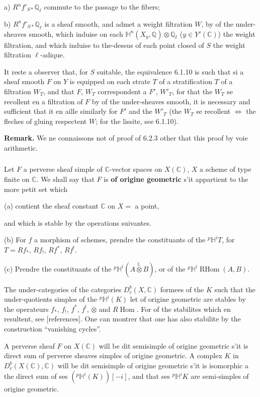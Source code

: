 \documentclass[12pt,a4paper]{article}
\theoremstyle{plain}
\theoremstyle{definition}
\theoremstyle{remark}
\DeclareMathOperator{\Hom}{Hom}
\DeclareMathOperator{\RHom}{RHom}
\newcommand{\CC}{\mathbb{C}}
\newcommand{\HH}{\mathbb{H}}
\newcommand{\QQ}{\mathbb{Q}}
\newcommand{\LL}{\mathbb{L}}
\begin{document}
a) $R^nf'_{S*}\QQ_{\ell}$ commute to the passage to the fibers;

b) $R^nf'_{S*}\QQ_{\ell}$ is a sheaf smooth, and admet a weight filtration $W$, by of the under-sheaves smooth, which induise on each $\HH^n(X_y, \QQ) \otimes \QQ_{\ell}$ ($y \in Y'(\CC)$) the weight filtration, and which induise to the-dessus of each point closed of $S$ the weight filtration $\ell$-adique.

It reste a observer that, for $S$ suitable, the equivalence 6.1.10 is such that si a sheaf smooth $F$ on $Y$ is equipped on each strate $T$ of a stratification $T$ of a filtration $W_T$, and that $F$, $W_T$ correspondent a $F'$, $W'_T$, for that the $W_T$ se recollent en a filtration of $F$ by of the under-sheaves smooth, it is necessary and sufficient that it en aille similarly for $F'$ and the $W'_T$ (the $W_T$ se recollent $\Leftrightarrow$ the fleches of gluing respectent $W$; for the lissite, see 6.1.10).

\medskip
\noindent\textbf{Remark.} We ne connaissons not of proof of 6.2.3 other that this proof by voie arithmetic.

\subsubsection{}
Let $F$ a perverse sheaf simple of $\CC$-vector spaces on $X(\CC)$, $X$ a scheme of type finite on $\CC$. We shall say that $F$ is \textbf{of origine geometric} s'it appartient to the more petit set which

(a) contient the sheaf constant $\CC$ on $X =$ a point,

and which is stable by the operations suivantes.

(b) For $f$ a morphism of schemes, prendre the constituants of the ${}^{p}\HH^iT$, for $T = Rf_*$, $Rf_!$, $Rf^*$, $Rf^!$.

(c) Prendre the constituants of the ${}^{p}\HH^i(A \overset{\LL}{\otimes} B)$, or of the ${}^{p}\HH^i\RHom(A, B)$.

The under-categories of the categories $D^b_c(X, \CC)$ formees of the $K$ such that the under-quotients simples of the ${}^{p}\HH^i(K)$ let of origine geometric are stables by the operateurs $f_*$, $f_!$, $f^*$, $f^!$, $\otimes$ and $R\Hom$. For of the stabilites which en resultent, see [references]. One can montrer that one has also stabilite by the construction ``vanishing cycles''.

A perverse sheaf $F$ on $X(\CC)$ will be dit semisimple of origine geometric s'it is direct sum of perverse sheaves simples of origine geometric. A complex $K$ in $D^b_c(X(\CC), \CC)$ will be dit semisimple of origine geometric s'it is isomorphic a the direct sum of ses $({}^{p}\HH^i(K))[-i]$, and that ses ${}^{p}\HH^iK$ are semi-simples of origine geometric.
\end{document}
